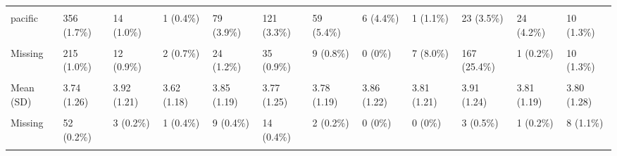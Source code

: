 \documentclass[
  single column]{article}
\begin{document}
\begin{landscape}
\begin{longtable}[t]{llllllllllll}
\cellcolor{gray!10}{maori} & \cellcolor{gray!10}{2335 (10.8\%)} & \cellcolor{gray!10}{143 (10.5\%)} & \cellcolor{gray!10}{23 (8.5\%)} & \cellcolor{gray!10}{194 (9.6\%)} & \cellcolor{gray!10}{340 (9.2\%)} & \cellcolor{gray!10}{205 (18.7\%)} & \cellcolor{gray!10}{5 (3.7\%)} & \cellcolor{gray!10}{6 (6.9\%)} & \cellcolor{gray!10}{13 (2.0\%)} & \cellcolor{gray!10}{59 (10.2\%)} & \cellcolor{gray!10}{159 (21.4\%)}\\
\addlinespace
pacific & 356 (1.7\%) & 14 (1.0\%) & 1 (0.4\%) & 79 (3.9\%) & 121 (3.3\%) & 59 (5.4\%) & 6 (4.4\%) & 1 (1.1\%) & 23 (3.5\%) & 24 (4.2\%) & 10 (1.3\%)\\
\cellcolor{gray!10}{asian} & \cellcolor{gray!10}{760 (3.5\%)} & \cellcolor{gray!10}{18 (1.3\%)} & \cellcolor{gray!10}{68 (25.2\%)} & \cellcolor{gray!10}{149 (7.4\%)} & \cellcolor{gray!10}{192 (5.2\%)} & \cellcolor{gray!10}{34 (3.1\%)} & \cellcolor{gray!10}{82 (60.3\%)} & \cellcolor{gray!10}{1 (1.1\%)} & \cellcolor{gray!10}{399 (60.6\%)} & \cellcolor{gray!10}{1 (0.2\%)} & \cellcolor{gray!10}{36 (4.8\%)}\\
Missing & 215 (1.0\%) & 12 (0.9\%) & 2 (0.7\%) & 24 (1.2\%) & 35 (0.9\%) & 9 (0.8\%) & 0 (0\%) & 7 (8.0\%) & 167 (25.4\%) & 1 (0.2\%) & 10 (1.3\%)\\
\cellcolor{gray!10}{extraversion} & \cellcolor{gray!10}{} & \cellcolor{gray!10}{} & \cellcolor{gray!10}{} & \cellcolor{gray!10}{} & \cellcolor{gray!10}{} & \cellcolor{gray!10}{} & \cellcolor{gray!10}{} & \cellcolor{gray!10}{} & \cellcolor{gray!10}{} & \cellcolor{gray!10}{} & \cellcolor{gray!10}{}\\
Mean (SD) & 3.74 (1.26) & 3.92 (1.21) & 3.62 (1.18) & 3.85 (1.19) & 3.77 (1.25) & 3.78 (1.19) & 3.86 (1.22) & 3.81 (1.21) & 3.91 (1.24) & 3.81 (1.19) & 3.80 (1.28)\\
\addlinespace
\cellcolor{gray!10}{Median [Min, Max]} & \cellcolor{gray!10}{3.75 [1.00, 7.00]} & \cellcolor{gray!10}{4.00 [1.00, 7.00]} & \cellcolor{gray!10}{3.67 [1.00, 7.00]} & \cellcolor{gray!10}{4.00 [1.00, 7.00]} & \cellcolor{gray!10}{3.75 [1.00, 7.00]} & \cellcolor{gray!10}{3.75 [1.00, 7.00]} & \cellcolor{gray!10}{4.00 [1.50, 7.00]} & \cellcolor{gray!10}{3.75 [1.00, 6.25]} & \cellcolor{gray!10}{4.00 [1.00, 7.00]} & \cellcolor{gray!10}{3.75 [1.00, 7.00]} & \cellcolor{gray!10}{3.75 [1.00, 7.00]}\\
Missing & 52 (0.2\%) & 3 (0.2\%) & 1 (0.4\%) & 9 (0.4\%) & 14 (0.4\%) & 2 (0.2\%) & 0 (0\%) & 0 (0\%) & 3 (0.5\%) & 1 (0.2\%) & 8 (1.1\%)\\
\cellcolor{gray!10}{hlth\_disability\_binary} & \cellcolor{gray!10}{} & \cellcolor{gray!10}{} & \cellcolor{gray!10}{} & \cellcolor{gray!10}{} & \cellcolor{gray!10}{} & \cellcolor{gray!10}{} & \cellcolor{gray!10}{} & \cellcolor{gray!10}{} & \cellcolor{gray!10}{} & \cellcolor{gray!10}{} & \cellcolor{gray!10}{}\\

\end{longtable}
\end{landscape}
\end{document}
